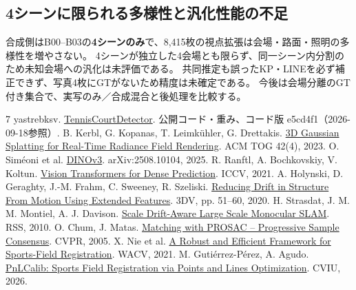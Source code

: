 \documentclass[a4paper,10pt]{article}
\begin{document}
\subsection{4シーンに限られる多様性と汎化性能の不足}
合成側はB00--B03の\textbf{4シーンのみ}で、8,415枚の視点拡張は会場・路面・照明の多様性を増やさない。
4シーンが独立した4会場とも限らず、同一シーン内分割のため未知会場への汎化は未評価である。
共同推定も誤ったKP・LINEを必ず補正できず、写真4枚にGTがないため精度は未確定である。
今後は会場分離のGT付き集合で、実写のみ／合成混合と後処理を比較する。

\begin{thebibliography}{7}\fontsize{8}{10}\selectfont\setlength{\itemsep}{0mm}
 yastrebksv. \href{https://github.com/yastrebksv/TennisCourtDetector}{TennisCourtDetector}. 公開コード・重み、コード版 e5cd4f1（2026-09-18参照）.
 B. Kerbl, G. Kopanas, T. Leimkühler, G. Drettakis. \href{https://repo-sam.inria.fr/fungraph/3d-gaussian-splatting/}{3D Gaussian Splatting for Real-Time Radiance Field Rendering}. ACM TOG 42(4), 2023.
 O. Siméoni et al. \href{https://arxiv.org/abs/2508.10104}{DINOv3}. arXiv:2508.10104, 2025.
 R. Ranftl, A. Bochkovskiy, V. Koltun. \href{https://openaccess.thecvf.com/content/ICCV2021/html/Ranftl_Vision_Transformers_for_Dense_Prediction_ICCV_2021_paper.html}{Vision Transformers for Dense Prediction}. ICCV, 2021.
 A. Holynski, D. Geraghty, J.-M. Frahm, C. Sweeney, R. Szeliski. \href{https://arxiv.org/abs/2008.12295}{Reducing Drift in Structure From Motion Using Extended Features}. 3DV, pp. 51--60, 2020.
 H. Strasdat, J. M. M. Montiel, A. J. Davison. \href{https://www.roboticsproceedings.org/rss06/p10.html}{Scale Drift-Aware Large Scale Monocular SLAM}. RSS, 2010.
 O. Chum, J. Matas. \href{https://cmp.felk.cvut.cz/~matas/papers/chum-prosac-cvpr05.pdf}{Matching with PROSAC -- Progressive Sample Consensus}. CVPR, 2005.
 X. Nie et al. \href{https://openaccess.thecvf.com/content/WACV2021/html/Nie_A_Robust_and_Efficient_Framework_for_Sports-Field_Registration_WACV_2021_paper.html}{A Robust and Efficient Framework for Sports-Field Registration}. WACV, 2021.
 M. Guti\'errez-P\'erez, A. Agudo. \href{https://arxiv.org/abs/2404.08401}{PnLCalib: Sports Field Registration via Points and Lines Optimization}. CVIU, 2026.
\end{thebibliography}
\end{document}
